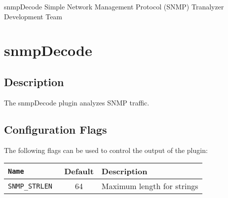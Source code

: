 \documentclass[documentation]{subfiles}
\begin{document}
\trantitle
    {snmpDecode} %
    {Simple Network Management Protocol (SNMP)} %
    {Tranalyzer Development Team} %

\section{snmpDecode}\label{s:snmpDecode}

\subsection{Description}
The snmpDecode plugin analyzes SNMP traffic.

\subsection{Configuration Flags}
The following flags can be used to control the output of the plugin:
\begin{longtable}{>{\tt}lcl}
    \toprule
    {\bf Name} & {\bf Default} & {\bf Description}\\
    \midrule\endhead%
    SNMP\_STRLEN & 64 & Maximum length for strings\\
    \bottomrule
\end{longtable}
\end{document}
